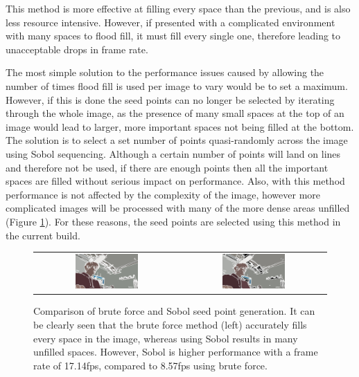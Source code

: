 This method is more effective at filling every space than the previous, and is also less resource intensive. However, if presented with a complicated environment with many spaces to flood fill, it must fill every single one, therefore leading to unacceptable drops in frame rate.

The most simple solution to the performance issues caused by allowing the number of times flood fill is used per image to vary would be to set a maximum. However, if this is done the seed points can no longer be selected by iterating through the whole image, as the presence of many small spaces at the top of an image would lead to larger, more important spaces not being filled at the bottom. The solution is to select a set number of points quasi-randomly across the image using Sobol sequencing. Although a certain number of points will land on lines and therefore not be used, if there are enough points then all the important spaces are filled without serious impact on performance. Also, with this method performance is not affected by the complexity of the image, however more complicated images will be processed with many of the more dense areas unfilled (Figure \ref{fig:BrutevsSobol}). For these reasons, the seed points are selected using this method in the current build.

\begin{figure}[H]
    \begin{center}
    \begin{tabular}{ c c }
        \includegraphics[width=0.45\textwidth]{Figures/Brute.jpg} &
        \includegraphics[width=0.45\textwidth]{Figures/Sobol.jpg}
    \end{tabular}
    \caption[Comparison of brute force and Sobol seed point generation]{Comparison of brute force and Sobol seed point generation. It can be clearly seen that the brute force method (left) accurately fills every space in the image, whereas using Sobol results in many unfilled spaces. However, Sobol is higher performance with a frame rate of 17.14fps, compared to 8.57fps using brute force.}
    \label{fig:BrutevsSobol}
    \end{center}
\end{figure}

